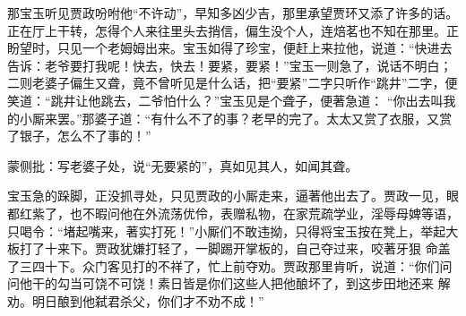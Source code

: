 \begin{parag}
    那宝玉听见贾政吩咐他“不许动”，早知多凶少吉，那里承望贾环又添了许多的话。正在厅上干转，怎得个人来往里头去捎信，偏生没个人，连焙茗也不知在那里。正盼望时，只见一个老姆姆出来。宝玉如得了珍宝，便赶上来拉他，说道：“快进去告诉：老爷要打我呢！快去，快去！要紧，要紧！”宝玉一则急了，说话不明白；二则老婆子偏生又聋，竟不曾听见是什么话，把“要紧”二字只听作“跳井”二字，便笑道：“跳井让他跳去，二爷怕什么？”宝玉见是个聋子，便著急道： “你出去叫我的小厮来罢。”那婆子道：“有什么不了的事？老早的完了。太太又赏了衣服，又赏了银子，怎么不了事的！”\begin{note}蒙侧批：写老婆子处，说“无要紧的”，真如见其人，如闻其聋。\end{note}
\end{parag}


\begin{parag}
    宝玉急的跺脚，正没抓寻处，只见贾政的小厮走来，逼著他出去了。贾政一见，眼都红紫了，也不暇问他在外流荡优伶，表赠私物，在家荒疏学业，淫辱母婢等语，只喝令：“堵起嘴来，著实打死！”小厮们不敢违拗，只得将宝玉按在凳上，举起大板打了十来下。贾政犹嫌打轻了，一脚踢开掌板的，自己夺过来，咬著牙狠 命盖了三四十下。众门客见打的不祥了，忙上前夺劝。贾政那里肯听，说道：“你们问问他干的勾当可饶不可饶！素日皆是你们这些人把他酿坏了，到这步田地还来 解劝。明日酿到他弑君杀父，你们才不劝不成！”
\end{parag}


